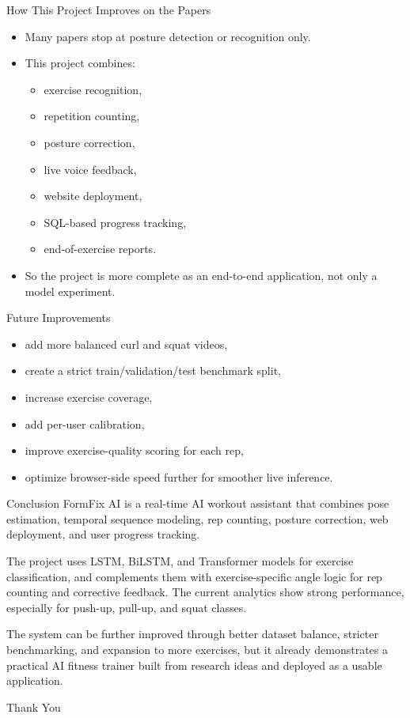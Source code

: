\documentclass[aspectratio=169]{beamer}
\begin{document}
\begin{frame}{How This Project Improves on the Papers}
\small
\begin{itemize}
  \item Many papers stop at posture detection or recognition only.
  \item This project combines:
  \begin{itemize}
    \item exercise recognition,
    \item repetition counting,
    \item posture correction,
    \item live voice feedback,
    \item website deployment,
    \item SQL-based progress tracking,
    \item end-of-exercise reports.
  \end{itemize}
  \item So the project is more complete as an end-to-end application, not only a model experiment.
\end{itemize}
\end{frame}

\begin{frame}{Future Improvements}
\begin{itemize}
  \item add more balanced curl and squat videos,
  \item create a strict train/validation/test benchmark split,
  \item increase exercise coverage,
  \item add per-user calibration,
  \item improve exercise-quality scoring for each rep,
  \item optimize browser-side speed further for smoother live inference.
\end{itemize}
\end{frame}

\begin{frame}{Conclusion}
\justifying
FormFix AI is a real-time AI workout assistant that combines pose estimation, temporal sequence modeling, rep counting, posture correction, web deployment, and user progress tracking.

\vspace{0.3cm}
The project uses LSTM, BiLSTM, and Transformer models for exercise classification, and complements them with exercise-specific angle logic for rep counting and corrective feedback. The current analytics show strong performance, especially for push-up, pull-up, and squat classes.

\vspace{0.3cm}
The system can be further improved through better dataset balance, stricter benchmarking, and expansion to more exercises, but it already demonstrates a practical AI fitness trainer built from research ideas and deployed as a usable application.
\end{frame}

\begin{frame}
  \centering
  \Huge Thank You
\end{frame}
\end{document}
